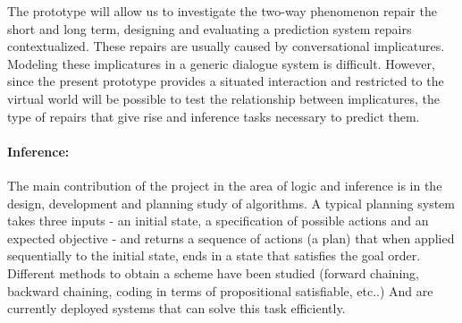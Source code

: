 The prototype will allow us to investigate the two-way phenomenon repair the
short and long term, designing and evaluating a prediction system repairs
contextualized. These repairs are usually caused by conversational implicatures.
Modeling these implicatures in a generic dialogue system is difficult. However,
since the present prototype provides a situated interaction and restricted to
the virtual world will be possible to test the relationship between
implicatures, the type of repairs that give rise and inference tasks necessary
to predict them. 


\paragraph{Inference:} 
The main contribution of the project in the area of logic and inference is in
the design, development and planning study of algorithms. A typical planning
system takes three inputs - an initial state, a specification of possible
actions and an expected objective - and returns a sequence of actions (a plan)
that when applied sequentially to the initial state, ends in a state that
satisfies the goal order. Different methods to obtain a scheme have been studied
(forward chaining, backward chaining, coding in terms of propositional
satisfiable, etc..) And are currently deployed systems that can solve this task
efficiently.


